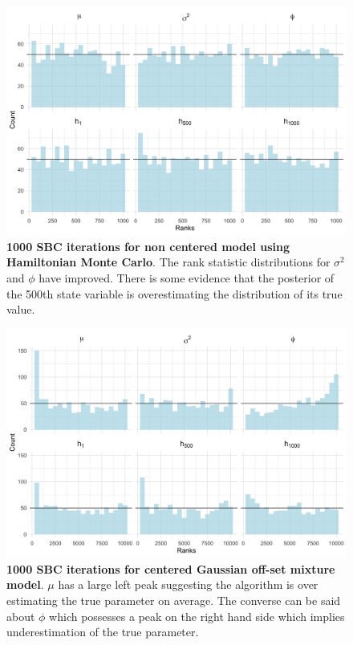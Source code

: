 \documentclass[12pt, a4paper]{article}
\begin{document}
        \begin{figure}[H]
        \centering
        \includegraphics[scale=0.09]{results/hmc_ncp_1k.png}
        \caption{\textbf{1000 SBC iterations for non centered model using Hamiltonian Monte Carlo}. The rank statistic distributions for $\sigma^2$ and $\phi$ have improved. There is some evidence that the posterior of the 500th state variable is overestimating the distribution of its true value.}
        \label{fig:ncphmc1k}
    \end{figure}

        \begin{figure}[H]
        \centering
        \includegraphics[scale=0.09]{results/ksc_cp_1k.png}
        \caption{\textbf{1000 SBC iterations for centered Gaussian off-set mixture model}. $\mu$ has a large left peak suggesting the algorithm is over estimating the true parameter on average. The converse can be said about $\phi$ which possesses a peak on the right hand side which implies underestimation of the true parameter.}
        \label{fig:cpksc1k}
    \end{figure}
\end{document}
